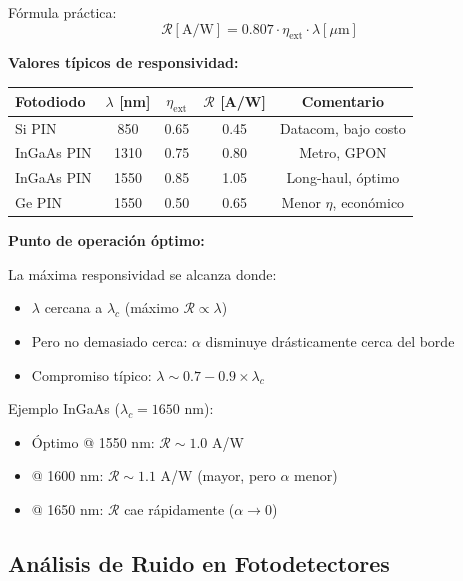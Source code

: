 \documentclass[11pt,a4paper]{article}
\begin{document}
Fórmula práctica:
\begin{equation}
    \mathcal{R}[\text{A/W}] = 0.807 \cdot \eta_{\text{ext}} \cdot \lambda[\mu\text{m}]
\end{equation}

\textbf{Valores típicos de responsividad:}

\begin{table}[h]
\centering
\begin{tabular}{lcccc}
\hline
\textbf{Fotodiodo} & \textbf{$\lambda$ [nm]} & \textbf{$\eta_{\text{ext}}$} & \textbf{$\mathcal{R}$ [A/W]} & \textbf{Comentario} \\
\hline
Si PIN & 850 & 0.65 & 0.45 & Datacom, bajo costo \\
InGaAs PIN & 1310 & 0.75 & 0.80 & Metro, GPON \\
InGaAs PIN & 1550 & 0.85 & 1.05 & Long-haul, óptimo \\
Ge PIN & 1550 & 0.50 & 0.65 & Menor $\eta$, económico \\
\hline
\end{tabular}
\end{table}

\begin{importante}
\textbf{Punto de operación óptimo:}

La máxima responsividad se alcanza donde:
\begin{itemize}
    \item $\lambda$ cercana a $\lambda_c$ (máximo $\mathcal{R} \propto \lambda$)
    \item Pero no demasiado cerca: $\alpha$ disminuye drásticamente cerca del borde
    \item Compromiso típico: $\lambda \sim 0.7-0.9 \times \lambda_c$
\end{itemize}

Ejemplo InGaAs ($\lambda_c = 1650$ nm):
\begin{itemize}
    \item Óptimo @ 1550 nm: $\mathcal{R} \sim 1.0$ A/W
    \item @ 1600 nm: $\mathcal{R} \sim 1.1$ A/W (mayor, pero $\alpha$ menor)
    \item @ 1650 nm: $\mathcal{R}$ cae rápidamente ($\alpha \to 0$)
\end{itemize}
\end{importante}

\subsection{Análisis de Ruido en Fotodetectores}
\end{document}

